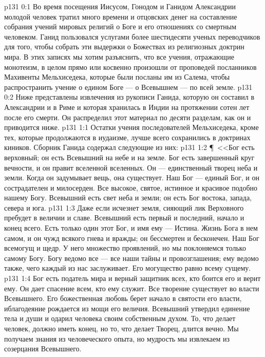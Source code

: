 \vs p131 0:1 Во время посещения Иисусом, Гонодом и Ганидом Александрии молодой человек тратил много времени и отцовских денег на составление собрания учений мировых религий о Боге и его отношениях со смертным человеком. Ганид пользовался услугами более шестидесяти ученых переводчиков для того, чтобы собрать эти выдержки о Божествах из религиозных доктрин мира. В этих записях мы хотим разъяснить, что все учения, отражающие монотеизм, в целом прямо или косвенно произошли от проповедей посланников Махивенты Мельхиседека, которые были посланы им из Салема, чтобы распространить учение о едином Боге --- о Всевышнем --- по всей земле.
\vs p131 0:2 Ниже представлены извлечения из рукописи Ганида, которую он составил в Александрии и в Риме и которая хранилась в Индии на протяжении сотен лет после его смерти. Он распределил этот материал по десяти разделам, как он и приводится ниже.
\vs p131 1:1 Остатки учения последователей Мельхиседека, кроме тех, которые продолжаются в иудаизме, лучше всего сохранились в доктринах киников. Сборник Ганида содержал следующие из них:
\vs p131 1:2 \P\ <<Бог есть верховный; он есть Всевышний на небе и на земле. Бог есть завершенный круг вечности, и он правит вселенной вселенных. Он --- единственный творец неба и земли. Когда он задумывает вещь, она существует. Наш Бог --- единый Бог, и он сострадателен и милосерден. Все высокое, святое, истинное и красивое подобно нашему Богу. Всевышний есть свет неба и земли; он есть Бог востока, запада, севера и юга.
\vs p131 1:3 Даже если исчезнет земля, сияющий лик Верховного пребудет в величии и славе. Всевышний есть первый и последний, начало и конец всего. Есть только один этот Бог, и имя ему --- Истина. Жизнь Бога в нем самом, и он чужд всякого гнева и вражды; он бессмертен и бесконечен. Наш Бог всемогущ и щедр. У него множество проявлений, но мы поклоняемся только самому Богу. Богу ведомо все --- все наши тайны и провозглашения; ему ведомо также, чего каждый из нас заслуживает. Его могущество равно всему сущему.
\vs p131 1:4 Бог есть податель мира и верный защитник всех, кто боится его и верит ему. Он дает спасение всем, кто ему служит. Все творение существует во власти Всевышнего. Его божественная любовь берет начало в святости его власти, иблагодеяние рождается из мощи его величия. Всевышний утвердил единение тела и души и одарил человека своим собственным духом. То, что делает человек, должно иметь конец, но то, что делает Творец, длится вечно. Мы получаем знания из человеческого опыта, но мудрость мы извлекаем из созерцания Всевышнего.

